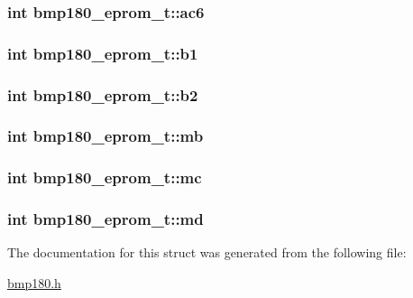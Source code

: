 \hypertarget{structbmp180__eprom__t_a25ed4b144b44291b7ce0e6c541dc7d81}{
\subsubsection[{ac6}]{\setlength{\rightskip}{0pt plus 5cm}int bmp180\+\_\+eprom\+\_\+t\+::ac6}}\label{structbmp180__eprom__t_a25ed4b144b44291b7ce0e6c541dc7d81}
\hypertarget{structbmp180__eprom__t_a05d3c6b4dbacea3865e0d2921c73947b}{
\subsubsection[{b1}]{\setlength{\rightskip}{0pt plus 5cm}int bmp180\+\_\+eprom\+\_\+t\+::b1}}\label{structbmp180__eprom__t_a05d3c6b4dbacea3865e0d2921c73947b}
\hypertarget{structbmp180__eprom__t_a8a15072c4811b8aab47aa1f56ed5f9cf}{
\subsubsection[{b2}]{\setlength{\rightskip}{0pt plus 5cm}int bmp180\+\_\+eprom\+\_\+t\+::b2}}\label{structbmp180__eprom__t_a8a15072c4811b8aab47aa1f56ed5f9cf}
\hypertarget{structbmp180__eprom__t_a3c8b4ef002f6352df19067f96d85f770}{
\subsubsection[{mb}]{\setlength{\rightskip}{0pt plus 5cm}int bmp180\+\_\+eprom\+\_\+t\+::mb}}\label{structbmp180__eprom__t_a3c8b4ef002f6352df19067f96d85f770}
\hypertarget{structbmp180__eprom__t_a4b07d3718d0b5973da174b833a3b89b7}{
\subsubsection[{mc}]{\setlength{\rightskip}{0pt plus 5cm}int bmp180\+\_\+eprom\+\_\+t\+::mc}}\label{structbmp180__eprom__t_a4b07d3718d0b5973da174b833a3b89b7}
\hypertarget{structbmp180__eprom__t_ac95bfabf36f884f842017c7306fe34e6}{
\subsubsection[{md}]{\setlength{\rightskip}{0pt plus 5cm}int bmp180\+\_\+eprom\+\_\+t\+::md}}\label{structbmp180__eprom__t_ac95bfabf36f884f842017c7306fe34e6}


The documentation for this struct was generated from the following file\+:\begin{DoxyCompactItemize}
\item 
\hyperlink{bmp180_8h}{bmp180.\+h}\end{DoxyCompactItemize}
